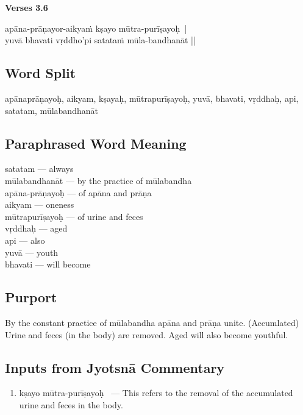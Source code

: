 \noindent \textbf{Verses 3.6}

\begin{shloka}
apāna-prāṇayor-aikyaṁ kṣayo mūtra-purīṣayoḥ |\\
yuvā bhavati vṛddho'pi satataṁ mūla-bandhanāt ||
\end{shloka}

\subsection*{Word Split}

apānaprāṇayoḥ, aikyam, kṣayaḥ, mūtrapurīṣayoḥ, yuvā, bhavati, vṛddhaḥ, api, satatam, mūlabandhanāt 

\subsection*{Paraphrased Word Meaning}

\begin{multicols}{2}
satatam ---  always\\
mūlabandhanāt --- by the practice of mūlabandha\\
apāna-prāṇayoḥ --- of apāna and prāṇa\\
aikyam --- oneness \\
mūtrapurīṣayoḥ --- of urine and feces \\
vṛddhaḥ --- aged\\
api --- also\\
yuvā --- youth\\
bhavati --- will become
\end{multicols}

\subsection*{Purport}

By the constant practice of mūlabandha apāna and prāṇa unite. (Accumlated) Urine and feces (in the body) are removed. Aged will also become youthful.

\subsection*{Inputs from Jyotsnā Commentary}

\begin{enumerate}
\item kṣayo mūtra-purīṣayoḥ  --- This refers to the removal of the accumulated urine and feces in the body. 
\end{enumerate}

